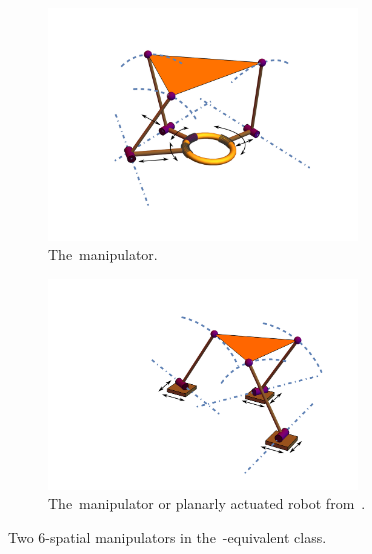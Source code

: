 \documentclass[DD]{iitmdiss}
\newcommand{\mcite}[1]{\cite{#1}}
\begin{document}
\begin{figure}[h]
	\centering
	\begin{subfigure}{0.6\textwidth}
		\centering
		\includegraphics[width=0.9\textwidth]{rprs.png}
		\caption{The~\rprs manipulator.}
		\label{fg:rprs}
	\end{subfigure}
	\begin{subfigure}{0.6\textwidth}
		\centering
		\includegraphics[width=0.9\textwidth]{pprs.png}
		\caption{The~\pprs manipulator or planarly actuated robot from~\mcite{benhorin1998}.}
		\label{fg:pprs}
	\end{subfigure}
	\caption{Two 6-\dofs spatial manipulators in the~\rps-equivalent class.}
\end{figure}
%
\end{document}
